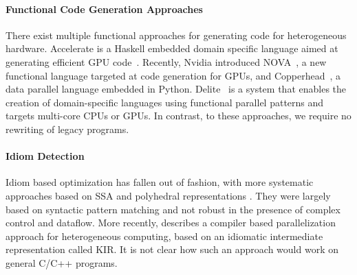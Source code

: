 {\paragraph{Functional Code Generation Approaches}
There exist multiple functional approaches for generating code for heterogeneous hardware.
Accelerate is a Haskell embedded domain specific language aimed at generating efficient GPU code~\cite{chakravarty11accelerating,mcdonell13optimising}.
Recently, Nvidia introduced NOVA~\cite{collins14nova}, a new functional language targeted at code generation for GPUs, and Copperhead~\cite{catanzaro11copperhead}, a data parallel language embedded in Python.
% 
% 
Delite~\cite{brown11heterogeneous,chafi11domain} is  a system that enables the creation of domain-specific languages using functional parallel patterns  and targets multi-core CPUs or GPUs.
 In contrast, to these approaches,
we  require no rewriting of legacy programs.

\paragraph{Idiom Detection}
Idiom based optimization \cite{Pinter:1994:POP:177492.177494} has
fallen out of fashion, with more systematic approaches
based on SSA \cite{lattner2004llvm} and polyhedral representations
\cite{benabderrahmane2010polyhedral}.
They were largely based on syntactic pattern matching and not robust in the presence of complex control and dataflow.
More recently, \cite{Andion2015Compilation} describes a compiler based
parallelization approach for heterogeneous computing, based on
an idiomatic intermediate representation called KIR.  
 It is not clear how such an approach would work on general
C/C++ programs.

}
